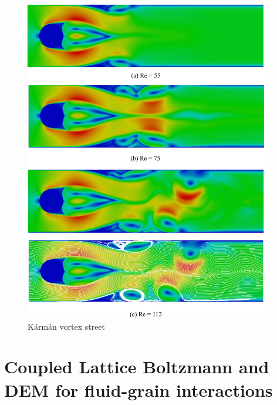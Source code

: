 \begin{figure}[htbp]
\centering
\includegraphics[width=0.95\textwidth]{karman}
\caption{K\'{a}rm\'{a}n vortex street}
\label{fig:karman}
\end{figure}


\section[Coupled LBM -- DEM for fluid--grain interactions]{Coupled Lattice 
Boltzmann and DEM for fluid-grain interactions}

